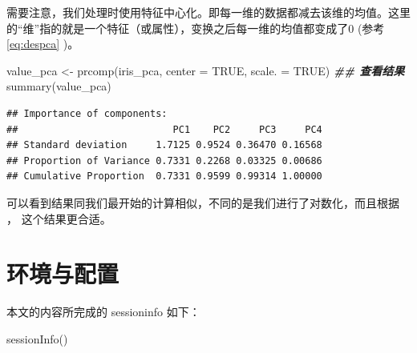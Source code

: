 \documentclass[
]{krantz}
\makeatletter
\newenvironment{Shaded}{\begin{snugshade}}{\end{snugshade}}
\newcommand{\AttributeTok}[1]{\textcolor[rgb]{0.77,0.63,0.00}{#1}}
\newcommand{\ConstantTok}[1]{\textcolor[rgb]{0.00,0.00,0.00}{#1}}
\newcommand{\DocumentationTok}[1]{\textcolor[rgb]{0.56,0.35,0.01}{\textbf{\textit{#1}}}}
\newcommand{\FunctionTok}[1]{\textcolor[rgb]{0.00,0.00,0.00}{#1}}
\newcommand{\NormalTok}[1]{#1}
\newcommand{\OtherTok}[1]{\textcolor[rgb]{0.56,0.35,0.01}{#1}}
\newenvironment{kframe}{%
\medskip{}
\setlength{\fboxsep}{.8em}
 \def\at@end@of@kframe{}%
 \ifinner\ifhmode%
  \def\at@end@of@kframe{\end{minipage}}%
  \begin{minipage}{\columnwidth}%
 \fi\fi%
 \def\FrameCommand##1{\hskip\@totalleftmargin \hskip-\fboxsep
 \colorbox{shadecolor}{##1}\hskip-\fboxsep
     \hskip-\linewidth \hskip-\@totalleftmargin \hskip\columnwidth}%
 \MakeFramed {\advance\hsize-\width
   \@totalleftmargin\z@ \linewidth\hsize
   \@setminipage}}%
 {\par\unskip\endMakeFramed%
 \at@end@of@kframe}
\renewenvironment{Shaded}{\begin{kframe}}{\end{kframe}}
\makeatother
\begin{document}
需要注意，我们处理时使用特征中心化。即每一维的数据都减去该维的均值。这里的``维''指的就是一个特征（或属性），变换之后每一维的均值都变成了0 (参考 \eqref{eq:despca} )。

\begin{Shaded}
\begin{Highlighting}[]
\NormalTok{value\_pca }\OtherTok{\textless{}{-}} \FunctionTok{prcomp}\NormalTok{(iris\_pca, }\AttributeTok{center =} \ConstantTok{TRUE}\NormalTok{, }\AttributeTok{scale. =} \ConstantTok{TRUE}\NormalTok{)}
\DocumentationTok{\#\# 查看结果}
\FunctionTok{summary}\NormalTok{(value\_pca)}
\end{Highlighting}
\end{Shaded}

\begin{verbatim}
## Importance of components:
##                           PC1    PC2     PC3     PC4
## Standard deviation     1.7125 0.9524 0.36470 0.16568
## Proportion of Variance 0.7331 0.2268 0.03325 0.00686
## Cumulative Proportion  0.7331 0.9599 0.99314 1.00000
\end{verbatim}

可以看到结果同我们最开始的计算相似，不同的是我们进行了对数化，而且根据 \citet{kemp2003modern}， 这个结果更合适。

\hypertarget{sessioninfo}{%
\chapter{环境与配置}\label{sessioninfo}}

本文的内容所完成的 sessioninfo 如下：

\begin{Shaded}
\begin{Highlighting}[]
\FunctionTok{sessionInfo}\NormalTok{()}
\end{Highlighting}
\end{Shaded}
\end{document}
